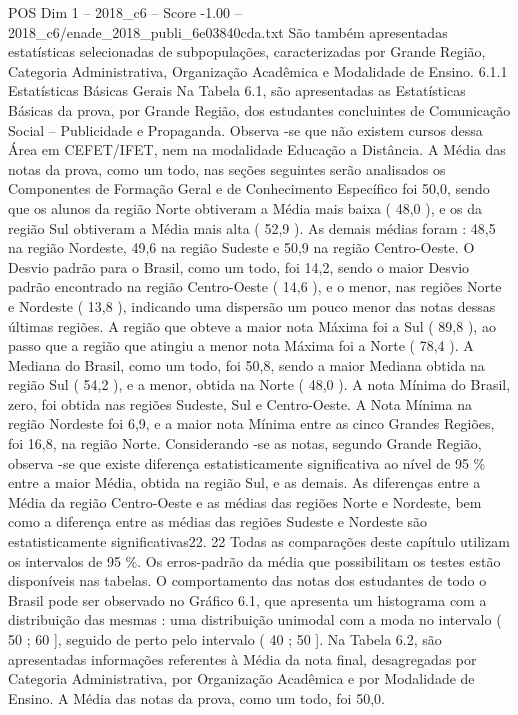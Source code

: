 \begin{textsample}{POS Dim 1 – 2018\_c6 – Score -1.00 – 2018\_c6/enade\_2018\_publi\_6e03840cda.txt}
São também apresentadas estatísticas selecionadas de subpopulações, caracterizadas por Grande Região, Categoria Administrativa, Organização Acadêmica e Modalidade de Ensino. 6.1.1 Estatísticas Básicas Gerais Na Tabela 6.1, são apresentadas as Estatísticas Básicas da prova, por Grande Região, dos estudantes concluintes de Comunicação Social – Publicidade e Propaganda.
Observa -se que não existem cursos dessa Área em CEFET/IFET, nem na modalidade Educação a Distância.
A Média das notas da prova, como um todo, nas seções seguintes serão analisados os Componentes de Formação Geral e de Conhecimento Específico foi 50,0, sendo que os alunos da região Norte obtiveram a Média mais baixa ( 48,0 ), e os da região Sul obtiveram a Média mais alta ( 52,9 ).
As demais médias foram : 48,5 na região Nordeste, 49,6 na região Sudeste e 50,9 na região Centro-Oeste.
O Desvio padrão para o Brasil, como um todo, foi 14,2, sendo o maior Desvio padrão encontrado na região Centro-Oeste ( 14,6 ), e o menor, nas regiões Norte e Nordeste ( 13,8 ), indicando uma dispersão um pouco menor das notas dessas últimas regiões.
A região que obteve a maior nota Máxima foi a Sul ( 89,8 ), ao passo que a região que atingiu a menor nota Máxima foi a Norte ( 78,4 ).
A Mediana do Brasil, como um todo, foi 50,8, sendo a maior Mediana obtida na região Sul ( 54,2 ), e a menor, obtida na Norte ( 48,0 ).
A nota Mínima do Brasil, zero, foi obtida nas regiões Sudeste, Sul e Centro-Oeste.
A Nota Mínima na região Nordeste foi 6,9, e a maior nota Mínima entre as cinco Grandes Regiões, foi 16,8, na região Norte.
Considerando -se as notas, segundo Grande Região, observa -se que existe diferença estatisticamente significativa ao nível de 95 \% entre a maior Média, obtida na região Sul, e as demais.
As diferenças entre a Média da região Centro-Oeste e as médias das regiões Norte e Nordeste, bem como a diferença entre as médias das regiões Sudeste e Nordeste são estatisticamente significativas22. 22 Todas as comparações deste capítulo utilizam os intervalos de 95 \%.
Os erros-padrão da média que possibilitam os testes estão disponíveis nas tabelas.
O comportamento das notas dos estudantes de todo o Brasil pode ser observado no Gráfico 6.1, que apresenta um histograma com a distribuição das mesmas : uma distribuição unimodal com a moda no intervalo ( 50 ; 60 ], seguido de perto pelo intervalo ( 40 ; 50 ].
Na Tabela 6.2, são apresentadas informações referentes à Média da nota final, desagregadas por Categoria Administrativa, por Organização Acadêmica e por Modalidade de Ensino.
A Média das notas da prova, como um todo, foi 50,0.

\end{textsample}

